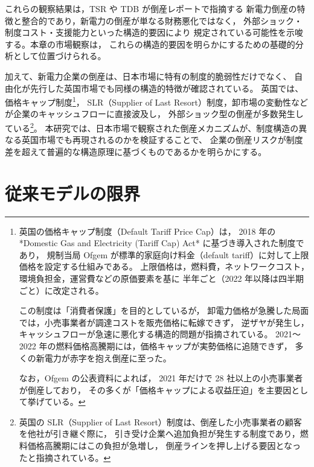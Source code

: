 これらの観察結果は，TSR や TDB が倒産レポートで指摘する
新電力倒産の特徴と整合的であり，新電力の倒産が単なる財務悪化ではなく，
外部ショック・制度コスト・支援能力といった構造的要因により
規定されている可能性を示唆する。本章の市場観察は，
これらの構造的要因を明らかにするための基礎的分析として位置づけられる。

加えて、新電力企業の倒産は、日本市場に特有の制度的脆弱性だけでなく、
自由化が先行した英国市場でも同様の構造的特徴が確認されている。
英国では、価格キャップ制度\footnote{
英国の価格キャップ制度（Default Tariff Price Cap）は，
2018 年の *Domestic Gas and Electricity (Tariff Cap) Act* に基づき導入された制度であり，
規制当局 Ofgem が標準的家庭向け料金（default tariff）に対して上限価格を設定する仕組みである。
上限価格は，燃料費，ネットワークコスト，環境負担金，運営費などの原価要素を基に
半年ごと（2022 年以降は四半期ごと）に改定される。

この制度は「消費者保護」を目的としているが，
卸電力価格が急騰した局面では，小売事業者が調達コストを販売価格に転嫁できず，
逆ザヤが発生し，キャッシュフローが急速に悪化する構造的問題が指摘されている。
2021～2022 年の燃料価格高騰期には，価格キャップが実勢価格に追随できず，
多くの新電力が赤字を抱え倒産に至った。

なお，Ofgem の公表資料によれば，
2021 年だけで 28 社以上の小売事業者が倒産しており，
その多くが「価格キャップによる収益圧迫」を主要因として挙げている。
}，
SLR（Supplier of Last Resort）制度，卸市場の変動性などが企業のキャッシュフローに直接波及し，
外部ショック型の倒産が多数発生している\footnote{
英国の SLR（Supplier of Last Resort）制度は、倒産した小売事業者の顧客を他社が引き継ぐ際に，
引き受け企業へ追加負担が発生する制度であり，燃料価格高騰期にはこの負担が急増し，
倒産ラインを押し上げる要因となったと指摘されている。
}。
本研究では、日本市場で観察された倒産メカニズムが、制度構造の異なる英国市場でも再現されるのかを検証することで、
企業の倒産リスクが制度差を超えて普遍的な構造原理に基づくものであるかを明らかにする。


\section{従来モデルの限界}

